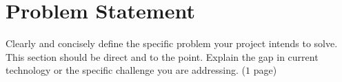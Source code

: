 
\chapter{Problem Statement}
\label{Chapter2}

Clearly and concisely define the specific problem your project intends to solve. This section should be direct and to the point. Explain the gap in current technology or the specific challenge you are addressing. ($1$ page)